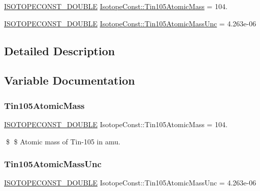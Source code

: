 \begin{DoxyCompactItemize}
\item 
\mbox{\hyperlink{group___isotope_const-_macros_ga8f45a7272ce02c0b4c65c44636ed719a}{I\+S\+O\+T\+O\+P\+E\+C\+O\+N\+S\+T\+\_\+\+D\+O\+U\+B\+LE}} \mbox{\hyperlink{group___isotope_const-_tin-_sn105_ga4ea300f6a6fd78baa36451fb1dc5ed40}{Isotope\+Const\+::\+Tin105\+Atomic\+Mass}} = 104.
\item 
\mbox{\hyperlink{group___isotope_const-_macros_ga8f45a7272ce02c0b4c65c44636ed719a}{I\+S\+O\+T\+O\+P\+E\+C\+O\+N\+S\+T\+\_\+\+D\+O\+U\+B\+LE}} \mbox{\hyperlink{group___isotope_const-_tin-_sn105_ga6247d28600418cde4b8969c2087e1664}{Isotope\+Const\+::\+Tin105\+Atomic\+Mass\+Unc}} = 4.\+263e-\/06
\end{DoxyCompactItemize}


\subsection{Detailed Description}


\subsection{Variable Documentation}
\mbox{\label{group___isotope_const-_tin-_sn105_ga4ea300f6a6fd78baa36451fb1dc5ed40}} 
\subsubsection{\texorpdfstring{Tin105\+Atomic\+Mass}{Tin105AtomicMass}}
{\footnotesize\ttfamily \mbox{\hyperlink{group___isotope_const-_macros_ga8f45a7272ce02c0b4c65c44636ed719a}{I\+S\+O\+T\+O\+P\+E\+C\+O\+N\+S\+T\+\_\+\+D\+O\+U\+B\+LE}} Isotope\+Const\+::\+Tin105\+Atomic\+Mass = 104.}

\$ \$ Atomic mass of Tin-\/105 in amu. \mbox{\label{group___isotope_const-_tin-_sn105_ga6247d28600418cde4b8969c2087e1664}} 
\subsubsection{\texorpdfstring{Tin105\+Atomic\+Mass\+Unc}{Tin105AtomicMassUnc}}
{\footnotesize\ttfamily \mbox{\hyperlink{group___isotope_const-_macros_ga8f45a7272ce02c0b4c65c44636ed719a}{I\+S\+O\+T\+O\+P\+E\+C\+O\+N\+S\+T\+\_\+\+D\+O\+U\+B\+LE}} Isotope\+Const\+::\+Tin105\+Atomic\+Mass\+Unc = 4.\+263e-\/06}

